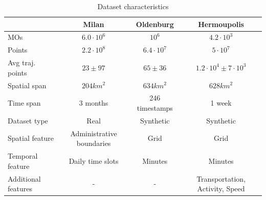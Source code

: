 \documentclass[preprint,12pt,authoryear]{elsarticle} %
\renewcommand{\sf}[1]{\textsf{\textup{#1}}}
\begin{document}

\begin{table}[t]
  \scriptsize\centering
  \caption{Dataset characteristics}
  \label{tab:datasets}%
    \begin{tabular}{l|ccc}
    \toprule
     & \sf{Milan} & \sf{Oldenburg} & \sf{Hermoupolis}\\
    \midrule
    MOs & $6.0 \cdot 10^6$ & $10^6$ & $4.2 \cdot 10^3$ \\
    Points & $2.2 \cdot 10^8$ & $6.4 \cdot 10^7$ & $5 \cdot 10^7$ \\
    Avg traj. points & $23 \pm 97$ & $65 \pm 36$ & $1.2 \cdot 10^4 \pm 7 \cdot 10^3$ \\
    Spatial span & $204 km^2$ & $634 km^2$ & $628 km^2$  \\
    Time span & 3 months & 246 timestamps & 1 week \\
    \midrule
    Dataset type & Real & Synthetic & Synthetic \\
    Spatial feature & Administrative boundaries & Grid  & Grid \\
    Temporal feature & Daily time slots & Minutes & Minutes \\
    Additional features & - & - & Transportation, Activity, Speed \\
    \bottomrule
    \end{tabular}%
    \label{tab:features}%
\end{table}%
\end{document}
